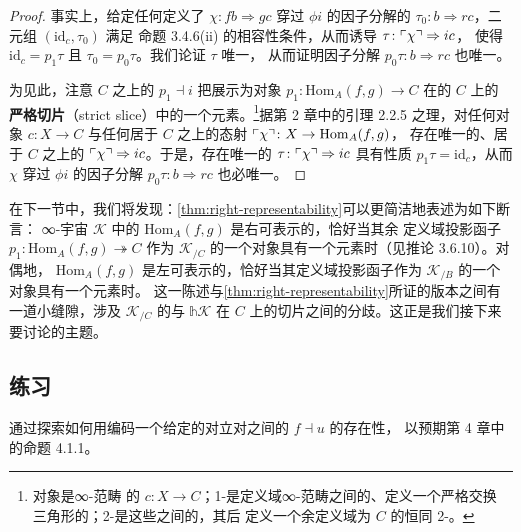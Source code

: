 \begin{proof}
事实上，给定任何定义了 $\chi\colon fb\Rightarrow gc$ 穿过 $\phi i$ 的因子分解的%
\trNaturalTransformation{} $\tau_{0}\colon b\Rightarrow rc$，二元组 $(\mathrm{id}_c,\tau_{0})$ 满足%
命题 3.4.6(ii) 的相容性条件，从而诱导\trNaturalTransformation{} $\tau\colon\ulcorner\chi\urcorner\Rightarrow ic$，%
使得 $\mathrm{id}_c=p_{1}\tau$ 且 $\tau_{0}=p_{0}\tau$。我们论证\trNaturalTransformation{} $\tau$ 唯一，%
从而证明因子分解 $p_{0}\tau\colon b\Rightarrow rc$ 也唯一。

为见此，注意 $C$ 之上的\trAdjunction{} $p_{1}\dashv i$ 把\trRightAdjoint{}展示为对象 %
$p_{1}\colon\mathrm{Hom}_A(f,g)\to C$ 在\trHomotopyTwoCategory{}的 $C$ 上的%
\textbf{严格切片}（strict slice）中的一个\trTerminal{}元素。\footnote{对象是∞-范畴%
的\trFunctor{} $c\colon X\to C$；1-\trCell{}是定义域∞-范畴之间的、定义一个严格交换%
三角形的\trFunctor{}；2-\trCell{}是这些\trFunctor{}之间的\trNaturalTransformation{}，其\trWhiskering{}后%
定义一个余定义域为 $C$ 的恒同 2-\trCell{}。}据第 2 章中的引理 2.2.5 之理，对任何对象%
$c\colon X\to C$ 与任何居于 $C$ 之上的态射 $\ulcorner\chi\urcorner\colon X\to\mathrm{Hom}_A(f,g)$，%
存在唯一的、居于 $C$ 之上的\trNaturalTransformation{} $\ulcorner\chi\urcorner\Rightarrow ic$。于是，存在唯一的\trNaturalTransformation{} %
$\tau\colon\ulcorner\chi\urcorner\Rightarrow ic$ 具有性质 $p_{1}\tau=\mathrm{id}_c$，从而 %
$\chi$ 穿过 $\phi i$ 的因子分解 $p_{0}\tau\colon b\Rightarrow rc$ 也必唯一。
\end{proof}

在下一节中，我们将发现：\cref{thm:right-representability}可以更简洁地表述为如下断言：%
∞-宇宙 $\mathcal{K}$ 中的\trCommaInfinityCategory{} $\mathrm{Hom}_A(f,g)$ 是右可表示的，恰好当其余%
定义域投影函子 $p_{1}\colon\mathrm{Hom}_A(f,g)\twoheadrightarrow C$ 作为\trSliceInfinityCosmos{}%
$\mathcal{K}_{/C}$ 的一个对象具有一个\trTerminal{}元素时（见推论 3.6.10）。对偶地，%
$\mathrm{Hom}_A(f,g)$ 是左可表示的，恰好当其定义域投影函子作为\trSliceInfinityCosmos{} %
$\mathcal{K}_{/B}$ 的一个对象具有一个\trInitial{}元素时。
这一陈述与\cref{thm:right-representability}所证的版本之间有一道小缝隙，涉及\trSliceInfinityCosmos{}%
$\mathcal{K}_{/C}$ 的\trHomotopyTwoCategory{}与\trHomotopyTwoCategory{} %
$\mathbb{h}\mathcal{K}$ 在 $C$ 上的切片之间的分歧。这正是我们接下来要讨论的主题。

\subsection*{练习}

\begin{exercise}\label{ex:anticipate-adjunction}
通过探索如何用\trCommaInfinityCategory{}编码一个给定的对立\trFunctor{}对之间的\trAdjunction{} $f\dashv u$ 的存在性，%
以预期第 4 章中的命题 4.1.1。
\end{exercise}

